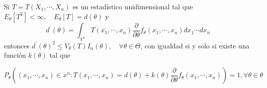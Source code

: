 \begin{teorema}
  Si $T=T\left(X_{1}, \cdots, X_{n}\right)$ es un estadístico unidimensional tal que $E_{\theta}\left[T^{2}\right]<\infty, \quad E_{\theta}[T]=d(\theta)$ y $$d^{\prime}(\theta)=\int_{\chi^{n}} T\left(x_{1}, \cdots, x_{n}\right) \frac{\partial}{\partial \theta} f_{\theta}\left(x_{1}, \cdots, x_{n}\right) d x_{1} \cdots d x_{n}$$ entonces $d^{\prime}(\theta)^{2} \leq V_{\theta}(T) I_{n}(\theta), \quad \forall \theta \in \Theta$, con igualdad si y solo si existe una función $k(\theta)$ tal que

  $$
    P_{\theta}\left(\left(x_{1}, \cdots, x_{n}\right) \in x^{n}: T\left(x_{1}, \cdots, x_{n}\right)=d(\theta)+k(\theta) \frac{\partial}{\partial \theta} f_{\theta}\left(x_{1}, \cdots, x_{n}\right)\right)=1, \forall \theta \in \theta
  $$
\end{teorema}

